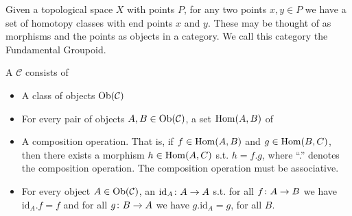 \documentclass[11pt,leqno,oneside]{amsart}
\newenvironment{dateenv}{
  \vspace{1em}
}{
  \vspace{1em}
}
\newcommand{\mydate}[4]{
  \newdate{#1}{#2}{#3}{#4}
  \begin{dateenv}
    \hfill\displaydate{#1}
  \end{dateenv}
}
\numberwithin{thm}{section}
\newcommand{\id}{\text{id}}
\begin{document}
Given a topological space \(X\) with points \(P\), for any two points
\(x,y \in P\) we have a set of homotopy classes with end points \(x\)
and \(y\). These may be thought of as morphisms and the points as
objects in a category. We call this category the Fundamental Groupoid.

\mydate{d2}{20}{1}{2017}

\begin{defn}
  A  $\mathcal{C}$ consists of
  \begin{itemize}
    \item A class of objects $\text{Ob}(\mathcal{C})$
    \item For every pair of objects $A, B \in \text{Ob}(\mathcal{C})$, a set $\operatorname{Hom}(A, B)$ of 
    \item A composition operation.  That is, if $f \in \operatorname{Hom}(A,B)$ and $g \in \operatorname{Hom}(B,C)$, then there exists a morphism $h \in \operatorname{Hom}(A,C)$ s.t. $h = f.g$, where ``.'' denotes the composition operation.  The composition operation must be associative.
    \item For every object $A \in \text{Ob}(\mathcal{C})$, an  $\id_A\from A \to A$ s.t. for all $f\colon A \to B$ we have $\id_A.f = f$ and for all $g\colon B \to A$ we have $g.\id_A = g$, for all $B$.
  \end{itemize}
\end{defn}
\end{document}
